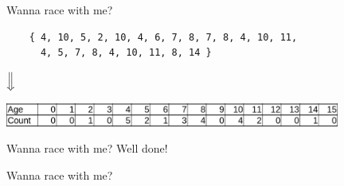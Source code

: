 \documentclass{beamer}
\begin{document}

\begin{frame}[fragile]{Wanna race with me?}
	\begin{verbatim}
	{ 4, 10, 5, 2, 10, 4, 6, 7, 8, 7, 8, 4, 10, 11,
	  4, 5, 7, 8, 4, 10, 11, 8, 14 }
	\end{verbatim}
	\centering$\Big\Downarrow$
	\begin{center}
		\includegraphics[width=11cm]{img/array-normal.png}
	\end{center}
\end{frame}


\begin{frame}{Wanna race with me?}
	\centering Well done!
	\begin{center}
	\end{center}
\end{frame}


\begin{frame}{Wanna race with me?}
	\begin{center}
	\end{center}
\end{frame}
\end{document}
